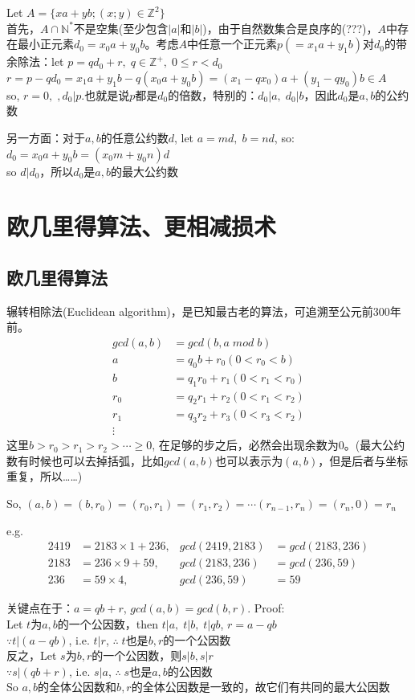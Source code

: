 \documentclass[../main.tex]{subfiles}
\begin{document}
Let $A=\{xa+yb;(x;y) \in \mathbb{Z}^2\}$\\
首先，$A\cap \mathbb{N}^{*}$不是空集(至少包含$|a|和|b|$)，由于自然数集合是良序的(???)，$A$中存在最小正元素$d_0=x_0a+y_0b$。考虑$A$中任意一个正元素$p(=x_1a+y_1b)$对$d_0$的带余除法：let $p=qd_0+r, \; q\in \mathbb{Z}^+, \; 0 \le r < d_0$\\
$r=p-qd_0 = x_1a+y_1b - q(x_0a+y_0b)=(x_1-qx_0)a + (y_1-qy_0)b \in A$ \\
so, $r=0, \;, d_0|p$.也就是说$p$都是$d_0$的倍数，特别的：$d_0|a, \; d_0|b$，因此$d_0$是$a,b$的公约数

另一方面：对于$a,b$的任意公约数$d$, let $a=md, \; b=nd$, so:\\
$d_0=x_0a+y_0b = (x_0m+y_0n)d$\\
so $d|d_0$，所以$d_0$是$a,b$的最大公约数

\section{欧几里得算法、更相减损术}
\subsection{欧几里得算法}
辗转相除法(Euclidean algorithm)，是已知最古老的算法，可追溯至公元前300年前。
\begin{align*}
  gcd(a,b) &= gcd(b, a \; mod \; b)\\
  a&=q_0b+r_0(0<r_0<b)\\
  b&=q_1r_0+r_1(0<r_1<r_0)\\
  r_0&=q_2r_1+r_2(0<r_1<r_2)\\
  r_1&=q_3r_2+r_3(0<r_3<r_2)\\
  \vdots
\end{align*}
这里$b>r_0>r_1>r_2>\cdots \ge 0$, 在足够的步之后，必然会出现余数为0。(最大公约数有时候也可以去掉括弧，比如$gcd(a,b)$也可以表示为$(a,b)$，但是后者与坐标重复，所以……)

So, $(a,b)=(b,r_0)=(r_0,r_1)=(r_1,r_2)=\cdots (r_{n-1},r_n)=(r_n,0)=r_n$

e.g.
\begin{align*}
  2419 &=2183\times 1 + 236, &gcd(2419,2183)  &=gcd(2183,236)\\
  2183 &=236\times 9 + 59,   &gcd(2183, 236)  &=gcd(236, 59)\\
  236  &=59\times 4,         &gcd(236, 59)    &=59
\end{align*}

关键点在于：$a=qb+r$, $gcd(a,b)=gcd(b,r)$. Proof:\\
Let $t$为$a,b$的一个公因数，then $t|a,\; t|b, \;t|qb$, \; $r=a-qb$\\
$\because t|(a-qb)$, i.e.  $t|r$, $\therefore \; t$也是$b,r$的一个公因数\\
反之，Let $s$为$b,r$的一个公因数，则$s|b, s|r$\\
$\because s|(qb+r)$, i.e.  $s|a$, $\therefore \; s$也是$a,b$的公因数\\
So $a,b$的全体公因数和$b,r$的全体公因数是一致的，故它们有共同的最大公因数
\end{document}
